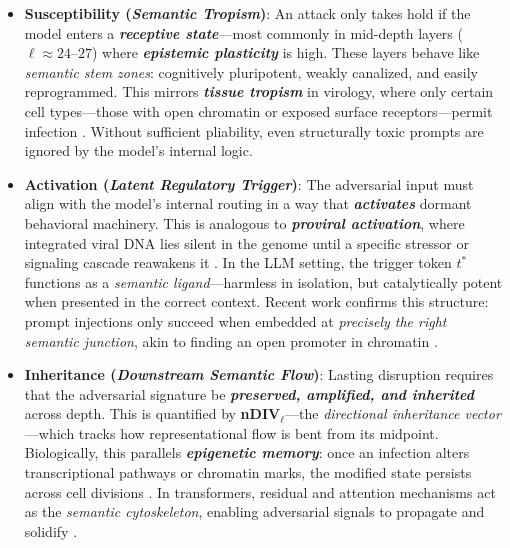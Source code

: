 \begin{itemize}[itemsep=1.2em]

  \item \textbf{Susceptibility (\emph{Semantic Tropism})}:  
  An attack only takes hold if the model enters a \textbf{\emph{receptive state}}—most commonly in mid-depth layers ($\ell \approx 24$–$27$) where \textbf{\textit{epistemic plasticity}} is high. These layers behave like \emph{semantic stem zones}: cognitively pluripotent, weakly canalized, and easily reprogrammed. This mirrors \textbf{\textit{tissue tropism}} in virology, where only certain cell types—those with open chromatin or exposed surface receptors—permit infection \cite{pomerantz1990tropism, zhang2021epigenetic, frantz2015cell}. Without sufficient pliability, even structurally toxic prompts are ignored by the model’s internal logic.

  \item \textbf{Activation (\emph{Latent Regulatory Trigger})}:  
  The adversarial input must align with the model’s internal routing in a way that \textbf{\emph{activates}} dormant behavioral machinery. This is analogous to \textbf{\textit{proviral activation}}, where integrated viral DNA lies silent in the genome until a specific stressor or signaling cascade reawakens it \cite{temin1974provirus, best1996activation, grow2015intrinsic}. In the LLM setting, the trigger token $t^*$ functions as a \emph{semantic ligand}—harmless in isolation, but catalytically potent when presented in the correct context. Recent work confirms this structure: prompt injections only succeed when embedded at \textit{precisely the right semantic junction}, akin to finding an open promoter in chromatin \cite{zou2023universaltransferableadversarialattacks, liu2023jailbroken}.

  \item \textbf{Inheritance (\emph{Downstream Semantic Flow})}:  
  Lasting disruption requires that the adversarial signature be \textbf{\emph{preserved, amplified, and inherited}} across depth. This is quantified by \textbf{nDIV}$_\ell$—the \textit{directional inheritance vector}—which tracks how representational flow is bent from its midpoint. Biologically, this parallels \textbf{\textit{epigenetic memory}}: once an infection alters transcriptional pathways or chromatin marks, the modified state persists across cell divisions \cite{jaenisch2003epigenetic, bird2007perceptions, cedar2009epigenetics}. In transformers, residual and attention mechanisms act as the \emph{semantic cytoskeleton}, enabling adversarial signals to propagate and solidify \cite{hendrycks2021aligning, zhu2024promptbench}.

\end{itemize}

